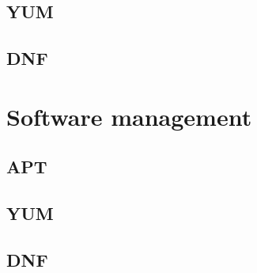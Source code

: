 \documentclass[a4paper,12pt,twoside,openright,titlepage]{book}
\begin{document}
\subsection{YUM}

\subsection{DNF}

\section{Software management}

\subsection{APT}

\subsection{YUM}

\subsection{DNF}

\end{document}

